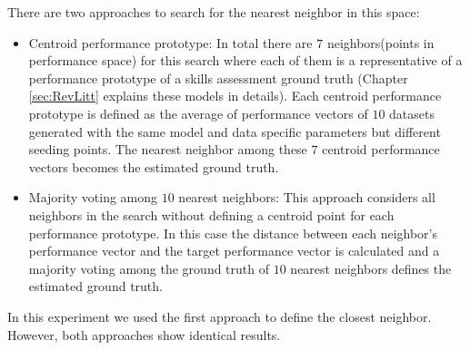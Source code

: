 There are two approaches to search for the nearest neighbor in this space:
\begin{itemize}
\item Centroid performance prototype: In total there are $7$ neighbors(points in performance space) for this search where each of them is a representative of a performance prototype of a skills assessment ground truth (Chapter \ref{sec:RevLitt} explains these models in details). Each centroid performance prototype is defined as the average of performance vectors of $10$ datasets generated with the same model and data specific parameters but different seeding points. The nearest neighbor among these $7$ centroid performance vectors becomes the estimated ground truth.
\item Majority voting among $10$ nearest neighbors: This approach considers all neighbors in the search without defining a centroid point for each performance prototype. In this case the distance between each neighbor's performance vector and the target performance vector is calculated and a majority voting among the ground truth of $10$ nearest neighbors defines the estimated ground truth.
\end{itemize}

In this experiment we used the first approach to define the closest neighbor. However, both approaches show identical results.






